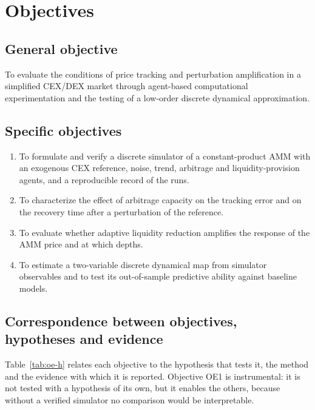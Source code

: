 \chapter{Objectives}
\label{cap:objetivos}

\section{General objective}

To evaluate the conditions of price tracking and perturbation amplification in a simplified CEX/DEX market through agent-based computational experimentation and the testing of a low-order discrete dynamical approximation.

\section{Specific objectives}

\begin{enumerate}[label=\textbf{OE\arabic*.}, leftmargin=3em]
  \item To formulate and verify a discrete simulator of a constant-product AMM with an exogenous CEX reference, noise, trend, arbitrage and liquidity-provision agents, and a reproducible record of the runs.
  \item To characterize the effect of arbitrage capacity on the tracking error and on the recovery time after a perturbation of the reference.
  \item To evaluate whether adaptive liquidity reduction amplifies the response of the AMM price and at which depths.
  \item To estimate a two-variable discrete dynamical map from simulator observables and to test its out-of-sample predictive ability against baseline models.
\end{enumerate}

\section{Correspondence between objectives, hypotheses and evidence}

Table~\ref{tab:oe-h} relates each objective to the hypothesis that tests it, the method and the evidence with which it is reported. Objective OE1 is instrumental: it is not tested with a hypothesis of its own, but it enables the others, because without a verified simulator no comparison would be interpretable.

